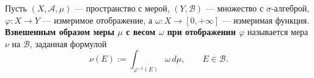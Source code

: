 \label{definition:29}

\begin{definition}
Пусть $(X,\mathcal A,\mu)$ --- пространство с мерой, $(Y,\mathcal B)$ --- множество с $\sigma$-алгеброй, $\varphi:X\to Y$ --- измеримое отображение, а $\omega:X\to[0,+\infty]$ --- измеримая функция.
\textbf{Взвешенным образом меры $\mu$ с весом $\omega$ при отображении $\varphi$} называется мера $\nu$ на $\mathcal B$, заданная формулой
\[
  \nu(E):=\int_{\varphi^{-1}(E)}\omega\,d\mu,
  \qquad E\in\mathcal B.
\]
\end{definition}
